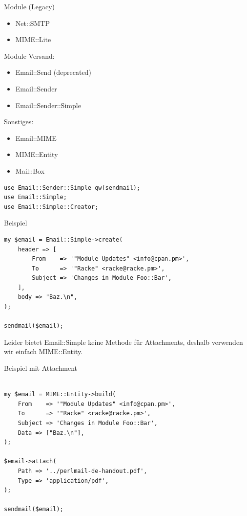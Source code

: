 \begin{frame}{Module (Legacy)}
  \begin{itemize}
    \item Net::SMTP
    \item MIME::Lite
  \end{itemize}
\end{frame}

\begin{frame}{Module}
  Versand:

  \begin{itemize}
  \item Email::Send (deprecated)
  \item Email::Sender
  \item Email::Sender::Simple
  \end{itemize}

  Sonstiges:

  \begin{itemize}
  \item Email::MIME
  \item MIME::Entity
  \item Mail::Box
  \end{itemize}

\end{frame}

\begin{lstlisting}
use Email::Sender::Simple qw(sendmail);
use Email::Simple;
use Email::Simple::Creator;
\end{lstlisting}

\begin{frame}[fragile]{Beispiel}
  \begin{verbatim}
my $email = Email::Simple->create(
    header => [
        From    => '"Module Updates" <info@cpan.pm>',
        To      => '"Racke" <racke@racke.pm>',
        Subject => 'Changes in Module Foo::Bar',
    ],
    body => "Baz.\n",
);

sendmail($email);
  \end{verbatim}
\end{frame}

Leider bietet Email::Simple keine Methode für Attachments, deshalb verwenden
wir einfach MIME::Entity.

\begin{frame}[fragile]{Beispiel mit Attachment}
\begin{verbatim}

my $email = MIME::Entity->build(
    From    => '"Module Updates" <info@cpan.pm>',
    To      => '"Racke" <racke@racke.pm>',
    Subject => 'Changes in Module Foo::Bar',
    Data => ["Baz.\n"],
);

$email->attach(
    Path => '../perlmail-de-handout.pdf',
    Type => 'application/pdf',
);

sendmail($email);
  \end{verbatim}
\end{frame}

